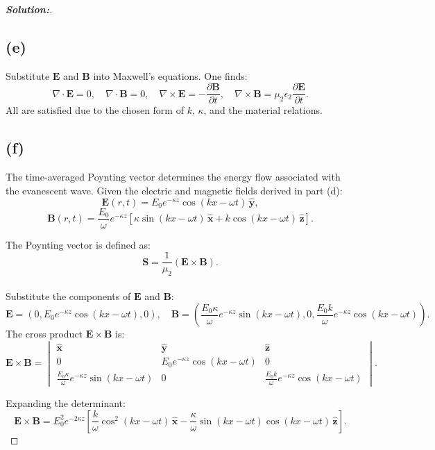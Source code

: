 \documentclass[12pt]{article}
\theoremstyle{definition}\newtheorem{problem}{Problem}
\newenvironment{solution}{\begin{proof}[\bfseries\textup{Solution:}]}{\end{proof}}
\begin{document}
\begin{solution}
    \subsection*{(e)}
    Substitute \(\mathbf{E}\) and \(\mathbf{B}\) into Maxwell’s equations. One finds:
    \[
    \nabla\cdot\mathbf{E}=0,\quad \nabla\cdot\mathbf{B}=0,\quad \nabla\times\mathbf{E}=-\frac{\partial \mathbf{B}}{\partial t},\quad \nabla\times\mathbf{B}=\mu_2\epsilon_2\frac{\partial \mathbf{E}}{\partial t}.
    \]
    All are satisfied due to the chosen form of \(k\), \(\kappa\), and the material relations.
    
    \subsection*{(f) }
    
The time-averaged Poynting vector determines the energy flow associated with the evanescent wave. Given the electric and magnetic fields derived in part (d):
\[
\mathbf{E}(r,t) = E_0 e^{-\kappa z}\cos(kx - \omega t)\,\hat{\mathbf{y}},
\]
\[
\mathbf{B}(r,t) = \frac{E_0}{\omega} e^{-\kappa z} \left[ \kappa \sin(kx-\omega t)\,\hat{\mathbf{x}} + k \cos(kx-\omega t)\,\hat{\mathbf{z}} \right].
\]

The Poynting vector is defined as:
\[
\mathbf{S} = \frac{1}{\mu_2} (\mathbf{E} \times \mathbf{B}).
\]

\paragraph{}  
Substitute the components of \(\mathbf{E}\) and \(\mathbf{B}\):
\[
\mathbf{E} = (0, E_0 e^{-\kappa z} \cos(kx - \omega t), 0), \quad 
\mathbf{B} = \left( \frac{E_0 \kappa}{\omega} e^{-\kappa z} \sin(kx - \omega t), 0, \frac{E_0 k}{\omega} e^{-\kappa z} \cos(kx - \omega t) \right).
\]
The cross product \(\mathbf{E} \times \mathbf{B}\) is:
\[
\mathbf{E} \times \mathbf{B} = 
\begin{vmatrix}
\hat{\mathbf{x}} & \hat{\mathbf{y}} & \hat{\mathbf{z}} \\[6pt]
0 & E_0 e^{-\kappa z} \cos(kx - \omega t) & 0 \\[6pt]
\frac{E_0 \kappa}{\omega} e^{-\kappa z} \sin(kx - \omega t) & 0 & \frac{E_0 k}{\omega} e^{-\kappa z} \cos(kx - \omega t)
\end{vmatrix}.
\]

Expanding the determinant:
\[
\mathbf{E} \times \mathbf{B} = E_0^2 e^{-2\kappa z} \left[ \frac{k}{\omega} \cos^2(kx - \omega t)\,\hat{\mathbf{x}} - \frac{\kappa}{\omega} \sin(kx - \omega t) \cos(kx - \omega t)\,\hat{\mathbf{z}} \right].
\]


\end{solution}
\end{document}
